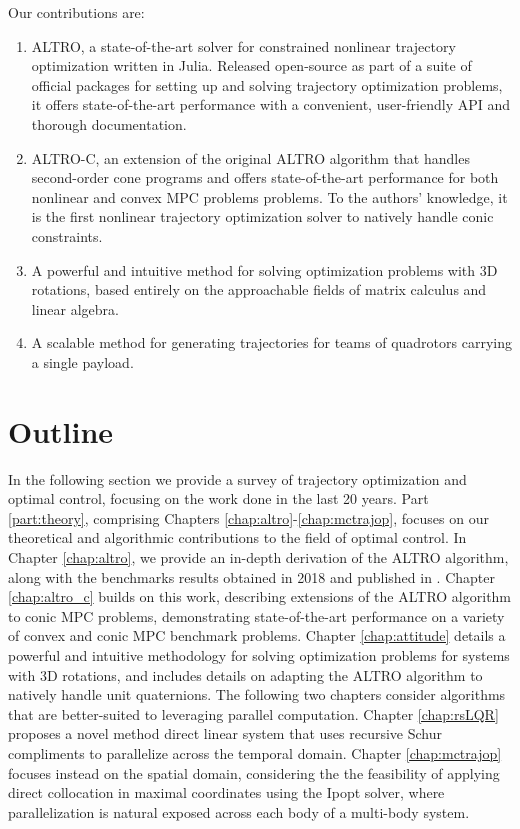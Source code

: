 \documentclass[../root.tex]{subfiles}
\begin{document}
Our contributions are:
\begin{enumerate}
    \item ALTRO, a state-of-the-art solver for constrained nonlinear trajectory 
    optimization written in Julia. Released open-source as part of a suite of 
    official packages for setting up and solving trajectory optimization problems,
    it offers state-of-the-art performance with a convenient, user-friendly API 
    and thorough documentation.
    \item ALTRO-C, an extension of the original ALTRO algorithm that handles
    second-order cone programs and offers state-of-the-art performance for
    both nonlinear and convex MPC problems problems. To the authors'
    knowledge, it is the first nonlinear trajectory optimization solver to
    natively handle conic constraints.
    \item A powerful and intuitive method for solving optimization problems with 
    3D rotations, based entirely on the approachable fields of matrix calculus
    and linear algebra.
    \item A scalable method for generating trajectories for teams of quadrotors
    carrying a single payload.
\end{enumerate}

\section{Outline}

In the following section we provide a survey of trajectory optimization and
optimal control, focusing on the work done in the last 20 years. Part
\ref{part:theory}, comprising Chapters
\ref{chap:altro}-\ref{chap:mctrajop}, focuses on our theoretical and
algorithmic contributions to the field of optimal control. In Chapter
\ref{chap:altro}, we provide an in-depth derivation of the ALTRO algorithm, along
with the benchmarks results obtained in 2018 and published in
\cite{howell_ALTRO_2019}. Chapter \ref{chap:altro_c} builds on this work,
describing extensions of the ALTRO algorithm to conic MPC problems,
demonstrating state-of-the-art performance on a variety of convex and conic MPC 
benchmark problems.
Chapter \ref{chap:attitude} details a powerful and intuitive methodology 
for solving optimization problems for systems with 3D rotations, and includes
details on adapting the ALTRO algorithm to natively handle unit quaternions. 
The following two chapters consider algorithms that are better-suited to 
leveraging parallel computation. Chapter \ref{chap:rsLQR} proposes a novel method direct 
linear system that uses recursive Schur compliments to parallelize across the temporal 
domain. Chapter \ref{chap:mctrajop} focuses instead on the spatial domain, considering the
the feasibility of applying direct collocation in maximal coordinates using the Ipopt 
solver, where parallelization is natural exposed across each body of a multi-body 
system.
\end{document}
